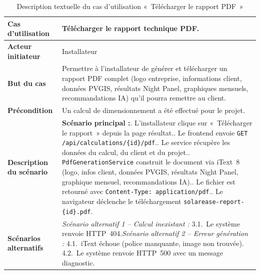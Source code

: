 \begin{table}[H]
  \caption{Description textuelle du cas d'utilisation «~Télécharger le rapport PDF~»}
  \label{tab:cu-telecharger-pdf}
  \centering
  \begin{tabularx}{\textwidth}{|L{3.8cm}|X|}
    \hline
    \textbf{Cas d'utilisation} & Télécharger le rapport technique PDF. \\
    \hline
    \textbf{Acteur initiateur} & Installateur \\
    \hline
    \textbf{But du cas} & Permettre à l'installateur de générer et télécharger un rapport PDF complet (logo entreprise, informations client, données PVGIS, résultats Night Panel, graphiques mensuels, recommandations IA) qu'il pourra remettre au client. \\
    \hline
    \textbf{Précondition} & Un calcul de dimensionnement a été effectué pour le projet. \\
    \hline
    \textbf{Description du scénario} &
    \textbf{Scénario principal :}. L'installateur clique sur «~Télécharger le rapport~» depuis la page résultat.. Le frontend envoie \texttt{GET /api/calculations/\{id\}/pdf}.. Le service récupère les données du calcul, du client et du projet.. \texttt{PdfGenerationService} construit le document via iText~8 (logo, infos client, données PVGIS, résultats Night Panel, graphique mensuel, recommandations IA).. Le fichier est retourné avec \texttt{Content-Type: application/pdf}.. Le navigateur déclenche le téléchargement \texttt{solarease-report-\{id\}.pdf}.\\
    \hline
    \textbf{Scénarios alternatifs} &
    \textit{Scénario alternatif 1 -- Calcul inexistant :}\newline
    \hspace*{6pt}3.1.~Le système renvoie HTTP~404.\newline[2pt]
    \textit{Scénario alternatif 2 -- Erreur génération :}\newline
    \hspace*{6pt}4.1.~iText échoue (police manquante, image non trouvée).\newline
    \hspace*{6pt}4.2.~Le système renvoie HTTP~500 avec un message diagnostic.\\
    \hline
  \end{tabularx}
\end{table}

